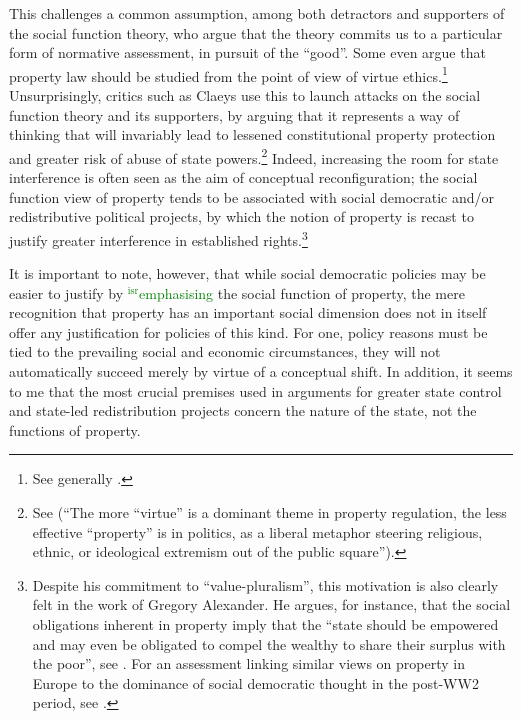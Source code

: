 \documentclass[12pt,a4paper]{book} %
\newcommand{\isr}[1]{\textcolor{green}{$^{\textrm{isr}}${#1}}}
\begin{document}
This challenges a common assumption, among both detractors and supporters of the social function theory, who argue that the theory commits us to a particular form of normative assessment, in pursuit of the ``good''. Some even argue that property law should be studied from the point of view of virtue ethics.\footnote{See generally \cite{penalver09}.} Unsurprisingly, critics such as Claeys use this to launch attacks on the social function theory and its supporters, by arguing that it represents a way of thinking that will invariably lead to lessened constitutional property protection and greater risk of abuse of state powers.\footnote{See \cite{claeys09} (``The more ``virtue'' is a dominant theme in property regulation, the less effective ``property'' is in politics, as a liberal metaphor steering religious, ethnic, or ideological extremism out of the public square'').} Indeed, increasing the room for state interference is often seen as the aim of conceptual reconfiguration; the social function view of property tends to be associated with social democratic and/or redistributive political projects, by which the notion of property is recast to justify greater interference in established rights.\footnote{Despite his commitment to ``value-pluralism'', this motivation is also clearly felt in the work of Gregory Alexander. He argues, for instance, that the social obligations inherent in property imply that the ``state should be empowered and may even be obligated to compel the wealthy to share their surplus with the poor'', see \cite[746]{alexander09}. For an assessment linking similar views on property in Europe to the dominance of social democratic thought in the post-WW2 period, see \cite{allen10}.}

It is important to note, however, that while social democratic policies may be easier to justify by \isr{emphasising} the social function of property, the mere recognition that property has an important social dimension does not in itself offer any justification for policies of this kind. For one, policy reasons must be tied to the prevailing social and economic circumstances, they will not automatically succeed merely by virtue of a conceptual shift. In addition, it seems to me that the most crucial premises used in arguments for greater state control and state-led redistribution projects concern the nature of the state, not the functions of property.
\end{document}
